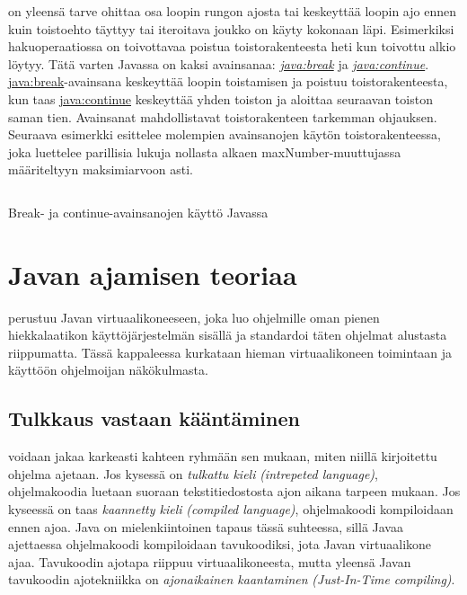 \documentclass{tufte-book}
\newcommand{\eng}[1]{\textit{(#1)}}
\newcommand{\new}[1]{\textit{\gls{#1}}}
\newcommand{\neweng}[2]{\new{#1} \eng{#2}}
\newcommand{\java}[1]{\underline{\gls{java:#1}}}
\newcommand{\newjava}[1]{\textit{\java{#1}}}
\newcommand{\code}[3]{
\begin{listing}
    \inputminted{java}{OhjelmointiopasEsimerkit/src/#1/#2.java}
    \caption{#3}
    \label{Java-#1-#2}
\end{listing}
}
\begin{document}
 on yleensä tarve ohittaa osa loopin rungon ajosta tai keskeyttää
loopin ajo ennen kuin toistoehto täyttyy tai iteroitava joukko on käyty kokonaan läpi. Esimerkiksi
hakuoperaatiossa on toivottavaa poistua toistorakenteesta heti kun toivottu alkio löytyy. Tätä
varten Javassa on kaksi avainsanaa: \newjava{break} ja \newjava{continue}. \java{break}-avainsana
keskeyttää loopin toistamisen ja poistuu toistorakenteesta, kun taas \java{continue} keskeyttää
yhden toiston ja aloittaa seuraavan toiston saman tien. Avainsanat mahdollistavat toistorakenteen
tarkemman ohjauksen. Seuraava esimerkki esittelee molempien avainsanojen käytön toistorakenteessa,
joka luettelee parillisia lukuja nollasta alkaen maxNumber-muuttujassa määriteltyyn
maksimiarvoon asti.

\code{week3/basicexamples}{BreakContinue}{Break- ja continue-avainsanojen käyttö Javassa}


\section{Javan ajamisen teoriaa}
\label{virtuaalikoneesta}

 perustuu Javan virtuaalikoneeseen, joka luo ohjelmille oman pienen
hiekkalaatikon käyttöjärjestelmän sisällä ja standardoi täten ohjelmat alustasta riippumatta.
Tässä kappaleessa kurkataan hieman virtuaalikoneen toimintaan ja käyttöön ohjelmoijan
näkökulmasta.

\subsection{Tulkkaus vastaan kääntäminen}
\label{JIT}

 voidaan jakaa karkeasti kahteen ryhmään sen mukaan, miten niillä
kirjoitettu ohjelma ajetaan. Jos kysessä on \neweng{tulkattu kieli}{intrepeted language},
ohjelmakoodia luetaan suoraan tekstitiedostosta ajon aikana tarpeen mukaan. Jos kyseessä on taas
\neweng{kaannetty kieli}{compiled language}, ohjelmakoodi kompiloidaan ennen ajoa. Java on
mielenkiintoinen tapaus tässä suhteessa, sillä Javaa ajettaessa ohjelmakoodi kompiloidaan
tavukoodiksi, jota Javan virtuaalikone ajaa. Tavukoodin ajotapa riippuu virtuaalikoneesta, mutta
yleensä Javan tavukoodin ajotekniikka on
\neweng{ajonaikainen kaantaminen}{Just-In-Time compiling}.
\end{document}
